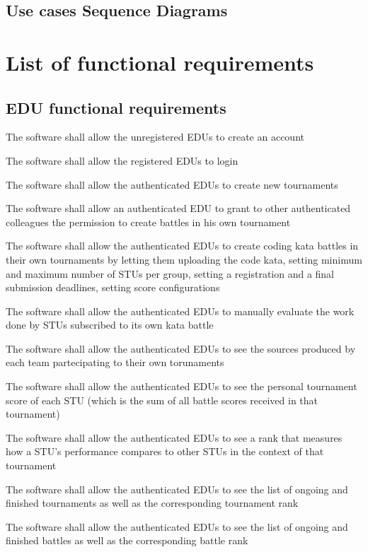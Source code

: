 \subsection{Use cases Sequence Diagrams}

\section*{List of functional requirements}
\subsection*{EDU functional requirements}
\begin{requirementsenumerate}
    \item The software shall allow the unregistered EDUs to create an account
    \item The software shall allow the registered EDUs to login
    \item The software shall allow the authenticated EDUs to create new tournaments
    \item The software shall allow an authenticated EDU to grant to other authenticated colleagues the permission to create battles in his own tournament
    \item The software shall allow the authenticated EDUs to create coding kata battles in their own tournaments by letting them uploading the code kata, setting minimum and maximum number of STUs per group, setting a registration and a final submission deadlines, setting score configurations
    \item The software shall allow the authenticated EDUs to manually evaluate the work done by STUs subscribed to its own kata battle
    \item The software shall allow the authenticated EDUs to see the sources produced by each team partecipating to their own torunaments
    \item The software shall allow the authenticated EDUs to see the personal tournament score of each STU (which is the sum of all battle scores received in that tournament)
    \item The software shall allow the authenticated EDUs to see a rank that measures how a STU's performance compares to other STUs in the context of that tournament
    \item The software shall allow the authenticated EDUs to see the list of ongoing and finished tournaments as well as the corresponding tournament rank
    \item The software shall allow the authenticated EDUs to see the list of ongoing and finished battles as well as the corresponding battle rank

\end{requirementsenumerate}
